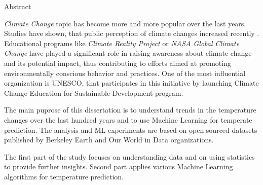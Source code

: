 \Large
\begin{center}
Abstract \\ 

\end{center}

\hspace{10pt}

\normalsize

\textit{Climate Change} topic has become more and more popular over the last years. 
Studies have shown, that public perception of climate changes increased recently \cite{publicperception}. 
Educational programs like \textit{Climate Reality Project} or \textit{NASA Global Climate Change} have played a significant role in raising awareness about climate change and its potential impact, thus contributing to efforts aimed at promoting environmentally conscious behavior and practices.
One of the most influential organization is UNESCO, that participates in this initiative by launching Climate Change Education for Sustainable Development program.

The main puprose of this dissertation is to understand trends in the temperature changes over the last hundred years and to use Machine Learning for temperate prediction.
The analysis and ML experiments are based on open sourced datasets published by Berkeley Earth and Our World in Data organizations.


The first part of the study focuses on understanding data and on using statistics to provide further insights.
Second part applies various Machine Learning algorithms for temperature prediction. 
